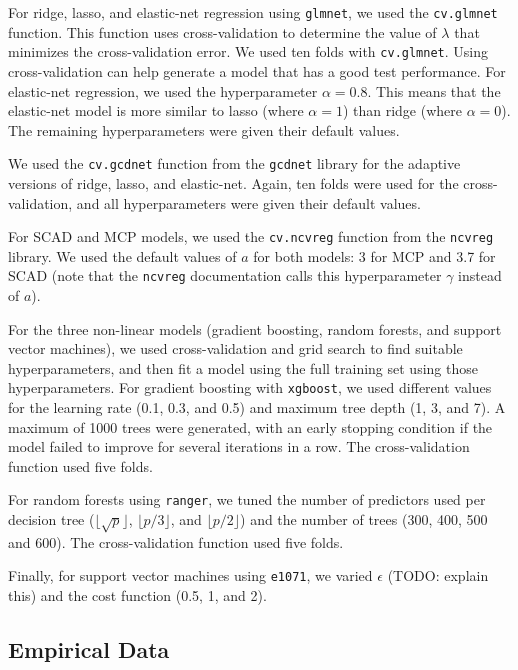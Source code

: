 \documentclass{article}
\begin{document}
For ridge, lasso, and elastic-net regression using \lstinline!glmnet!, we used the \lstinline!cv.glmnet! function. This function uses cross-validation to determine the value of $\lambda$ that minimizes the cross-validation error. We used ten folds with \lstinline!cv.glmnet!. Using cross-validation can help generate a model that has a good test performance. For elastic-net regression, we used the hyperparameter $\alpha = 0.8$. This means that the elastic-net model is more similar to lasso (where $\alpha = 1$) than ridge (where $\alpha = 0$). The remaining hyperparameters were given their default values.

We used the \lstinline!cv.gcdnet! function from the \lstinline!gcdnet! library for the adaptive versions of ridge, lasso, and elastic-net. Again, ten folds were used for the cross-validation, and all hyperparameters were given their default values.

For SCAD and MCP models, we used the \lstinline!cv.ncvreg! function from the \lstinline!ncvreg! library. We used the default values of $a$ for both models: 3 for MCP and 3.7 for SCAD (note that the \lstinline!ncvreg! documentation calls this hyperparameter $\gamma$ instead of $a$).

For the three non-linear models (gradient boosting, random forests, and support vector machines), we used cross-validation and grid search to find suitable hyperparameters, and then fit a model using the full training set using those hyperparameters. For gradient boosting with \lstinline!xgboost!, we used different values for the learning rate (0.1, 0.3, and 0.5) and maximum tree depth (1, 3, and 7). A maximum of 1000 trees were generated, with an early stopping condition if the model failed to improve for several iterations in a row. The cross-validation function used five folds.

For random forests using \lstinline!ranger!, we tuned the number of predictors used per decision tree ($\lfloor \sqrt{p}\rfloor$, $\lfloor p / 3 \rfloor$, and $\lfloor p / 2 \rfloor$) and the number of trees (300, 400, 500 and 600). The cross-validation function used five folds.

Finally, for support vector machines using \lstinline!e1071!, we varied $\epsilon$ (TODO: explain this) and the cost function (0.5, 1, and 2).




\subsection{Empirical Data}
\end{document}

